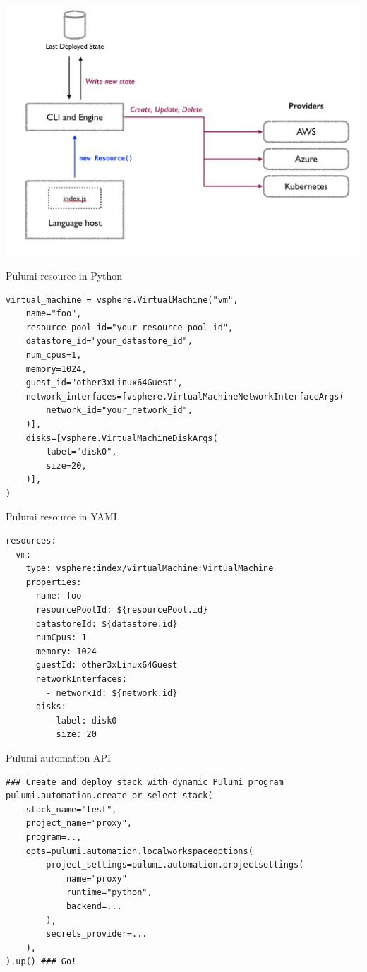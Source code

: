 \documentclass[12pt,aspectratio=169]{beamer}
\begin{document}
\begin{frame}
\includegraphics[width=0.8\paperwidth]{pulumi-images/pulumi-architecture-diagram.png}
\end{frame}

\begin{frame}[fragile]{Pulumi resource in Python}
\footnotesize
\begin{verbatim}
virtual_machine = vsphere.VirtualMachine("vm",
    name="foo",
    resource_pool_id="your_resource_pool_id",
    datastore_id="your_datastore_id",
    num_cpus=1,
    memory=1024,
    guest_id="other3xLinux64Guest",
    network_interfaces=[vsphere.VirtualMachineNetworkInterfaceArgs(
        network_id="your_network_id",
    )],
    disks=[vsphere.VirtualMachineDiskArgs(
        label="disk0",
        size=20,
    )],
)
\end{verbatim}
\end{frame}

\begin{frame}[fragile]{Pulumi resource in YAML}
\footnotesize
\begin{verbatim}
resources:
  vm:
    type: vsphere:index/virtualMachine:VirtualMachine
    properties:
      name: foo
      resourcePoolId: ${resourcePool.id}
      datastoreId: ${datastore.id}
      numCpus: 1
      memory: 1024
      guestId: other3xLinux64Guest
      networkInterfaces:
        - networkId: ${network.id}
      disks:
        - label: disk0
          size: 20
\end{verbatim}
\end{frame}

\begin{frame}[fragile]{Pulumi automation API}
\footnotesize
\begin{verbatim}
### Create and deploy stack with dynamic Pulumi program
pulumi.automation.create_or_select_stack(
    stack_name="test",
    project_name="proxy",
    program=..,
    opts=pulumi.automation.localworkspaceoptions(
        project_settings=pulumi.automation.projectsettings(
            name="proxy"
            runtime="python",
            backend=...
        ),
        secrets_provider=...
    ),
).up() ### Go!
\end{verbatim}
\end{frame}
\end{document}
